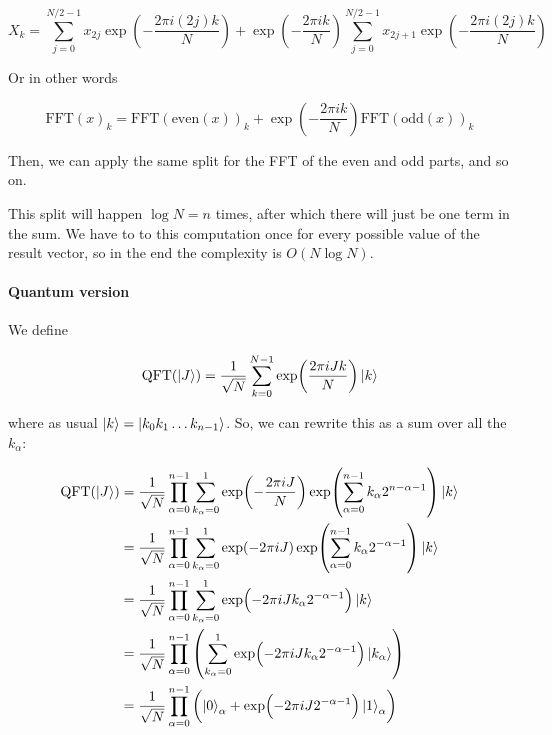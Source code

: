 \documentclass[main.tex]{subfiles}
\begin{document}
\begin{equation}
    X_k =
    \sum _{j=0}   ^{N/2-1} x_{2j} \exp(-\frac{2 \pi i(2j)k}{N}) +
    \exp(-\frac{2 \pi ik}{N})
    \sum _{j=0}   ^{N/2-1} x_{2j+1} \exp(-\frac{2 \pi i(2j)k}{N})
\end{equation}

Or in other words

\begin{equation}
    \text{FFT}(x)_k = \text{FFT} (\text{even}(x))_k
    + \exp(-\frac{2 \pi ik}{N}) \text{FFT} (\text{odd}(x))_k
\end{equation}

Then, we can apply the same split for the FFT of the even and odd parts, and so on.

This split will happen \(\log N = n\) times, after which there will just be one term in the sum.
We have to to this computation once for every possible value of the result vector, so in the end the complexity is \(O(N \log N)\).

\paragraph{Quantum version}

We define

\begin{equation}
    \text{QFT}(\ket{J}) = \frac{1}{\sqrt{N}} \sum _{k=0}   ^{N-1}
    \exp(\frac{2 \pi i J k}{N}) \ket{k}
\end{equation}

where as usual \(\ket{k} = \ket{k_0 k_1 \dots k_{n-1}} \). So, we can rewrite this as a sum over all the \(k_\alpha\):


\begin{subequations}
\begin{align}
    \text{QFT}(\ket{J}) &= \frac{1}{\sqrt{N}} \prod_{\alpha=0}^{n-1} \sum _{k_\alpha=0}   ^{1}
    \exp(-\frac{2 \pi i J}{N}) \exp(\sum _{\alpha=0}   ^{n-1} k_\alpha 2^{n-\alpha-1} )  \ket{k}  \\
    &=  \frac{1}{\sqrt{N}} \prod_{\alpha=0}^{n-1} \sum _{k_\alpha=0}   ^{1}
    \exp(-2 \pi i J) \exp(\sum _{\alpha=0}   ^{n-1} k_\alpha 2^{-\alpha-1} ) \ket{k} \\
    &=  \frac{1}{\sqrt{N}} \prod_{\alpha=0}^{n-1} \sum _{k_\alpha=0}   ^{1}
    \exp(-2 \pi i J k_\alpha 2^{-\alpha-1} ) \ket{k} \\
    &=  \frac{1}{\sqrt{N}} \prod_{\alpha=0}^{n-1}
    \qty(\sum _{k_\alpha=0}   ^{1}
    \exp(-2 \pi i J k_\alpha 2^{-\alpha-1} ) \ket{k_\alpha}) \\
    &=  \frac{1}{\sqrt{N}} \prod_{\alpha=0}^{n-1}
    \qty(    \ket{0}_\alpha + \exp(-2 \pi i J 2^{-\alpha-1} ) \ket{1}_\alpha)
\end{align}
\end{subequations}
\end{document}

